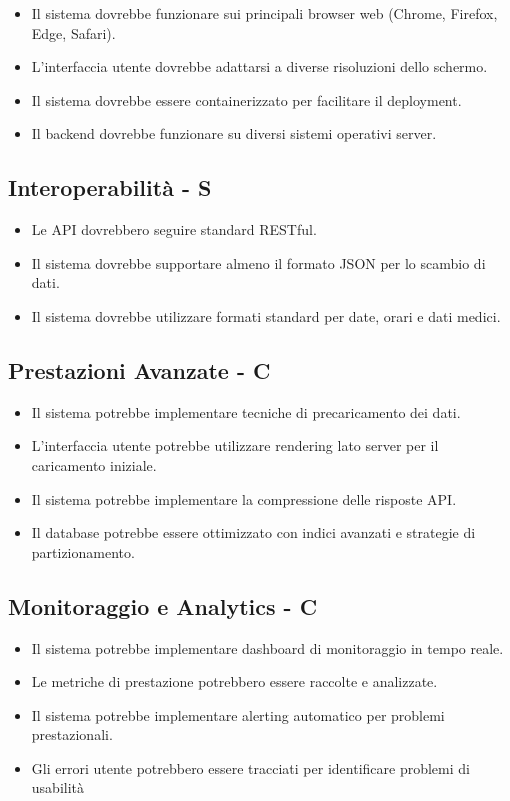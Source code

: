 \documentclass[12pt,a4paper,oneside]{report}
\begin{document}
\begin{itemize}
    \item Il sistema dovrebbe funzionare sui principali browser web (Chrome, Firefox, Edge, Safari).
    \item L'interfaccia utente dovrebbe adattarsi a diverse risoluzioni dello schermo.
    \item Il sistema dovrebbe essere containerizzato per facilitare il deployment.
    \item Il backend dovrebbe funzionare su diversi sistemi operativi server.
\end{itemize}

\subsection{Interoperabilità - S}

\begin{itemize}
    \item Le API dovrebbero seguire standard RESTful.
    \item Il sistema dovrebbe supportare almeno il formato JSON per lo scambio di dati.
    \item Il sistema dovrebbe utilizzare formati standard per date, orari e dati medici.
\end{itemize}

\subsection{Prestazioni Avanzate - C}

\begin{itemize}
    \item Il sistema potrebbe implementare tecniche di precaricamento dei dati.
    \item L'interfaccia utente potrebbe utilizzare rendering lato server per il caricamento iniziale.
    \item Il sistema potrebbe implementare la compressione delle risposte API.
    \item Il database potrebbe essere ottimizzato con indici avanzati e strategie di partizionamento.
\end{itemize}

\subsection{Monitoraggio e Analytics - C}

\begin{itemize}
    \item Il sistema potrebbe implementare dashboard di monitoraggio in tempo reale.
    \item Le metriche di prestazione potrebbero essere raccolte e analizzate.
    \item Il sistema potrebbe implementare alerting automatico per problemi prestazionali.
    \item Gli errori utente potrebbero essere tracciati per identificare problemi di usabilità
\end{itemize}
\end{document}
